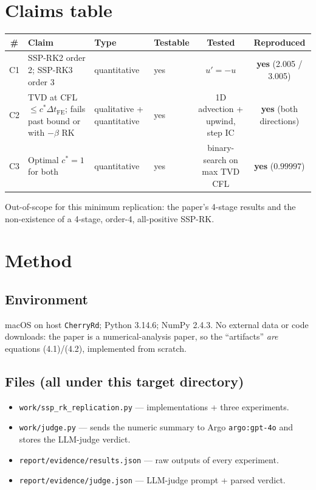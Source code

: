 \documentclass[11pt]{article}
\begin{document}
\section{Claims table}

\begin{center}
\small
\begin{tabular}{clllcc}
\toprule
\# & Claim & Type & Testable & Tested & Reproduced \\
\midrule
C1 & SSP-RK2 order 2; SSP-RK3 order 3 & quantitative & yes & $u'{=}{-}u$ & \textbf{yes} (2.005 / 3.005)\\
C2 & TVD at CFL $\le c^{\ast}\Delta t_{\mathrm{FE}}$; fails past bound or with $-\beta$ RK & qualitative + quantitative & yes & 1D advection + upwind, step IC & \textbf{yes} (both directions)\\
C3 & Optimal $c^{\ast} = 1$ for both & quantitative & yes & binary-search on max TVD CFL & \textbf{yes} ($0.99997$)\\
\bottomrule
\end{tabular}
\end{center}

Out-of-scope for this minimum replication: the paper's 4-stage results and
the non-existence of a 4-stage, order-4, all-positive SSP-RK.

\section{Method}

\subsection{Environment}
macOS on host \texttt{CherryRd}; Python 3.14.6; NumPy 2.4.3. No external
data or code downloads: the paper is a numerical-analysis paper, so the
``artifacts'' \emph{are} equations (4.1)/(4.2), implemented from scratch.

\subsection{Files (all under this target directory)}
\begin{itemize}
  \item \texttt{work/ssp\_rk\_replication.py} --- implementations + three experiments.
  \item \texttt{work/judge.py} --- sends the numeric summary to Argo \texttt{argo:gpt-4o} and stores the LLM-judge verdict.
  \item \texttt{report/evidence/results.json} --- raw outputs of every experiment.
  \item \texttt{report/evidence/judge.json} --- LLM-judge prompt + parsed verdict.
\end{itemize}
\end{document}
